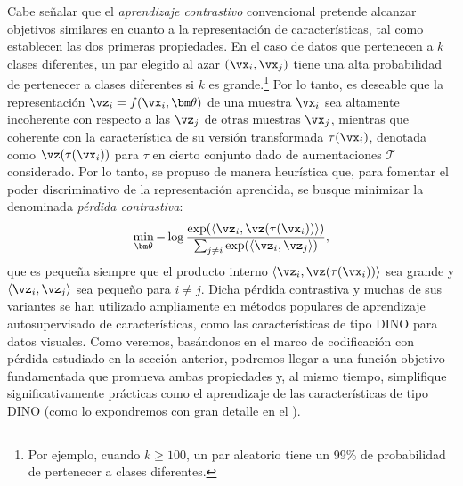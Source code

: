 \documentclass[../../book-main.tex]{subfiles}
\begin{document}
\begin{remark}
    Cabe señalar que el {\em aprendizaje contrastivo} convencional
    \citep{hadsell2006dimensionality,Van_den_Oord2018-qf,he2019momentum}
    pretende alcanzar objetivos similares en cuanto a la representación de características, tal como establecen las dos primeras
    propiedades. En el caso de datos que pertenecen a $k$ clases diferentes,
    un par elegido al azar $(\vx_i, \vx_j)$ tiene una alta probabilidad
    de pertenecer a clases diferentes si $k$ es grande.\footnote{Por
        ejemplo, cuando $k \ge 100$, un par aleatorio tiene un 99\% de probabilidad
    de pertenecer a clases diferentes.} Por lo tanto, es deseable que la
    representación $\vz_i = f(\vx_i, \bm \theta)$ de una muestra $\vx_i$ sea
    altamente incoherente con respecto a las $\vz_j$ de otras muestras $\vx_j$, mientras que
    coherente con la característica de su versión transformada $\tau(\vx_i)$, denotada
    como $\vz(\tau(\vx_i))$ para $\tau$ en cierto conjunto dado de aumentaciones $\mathcal
    T$ considerado. Por lo tanto, se propuso de manera heurística que, para
    fomentar el poder discriminativo de la representación aprendida, se busque
    minimizar la denominada {\em pérdida contrastiva}:
    \begin{equation}
        \min_{\bm \theta} - \log \frac{\exp(\langle \vz_i,
        \vz(\tau(\vx_i))\rangle)}{\sum_{j\not= i} \exp(\langle \vz_i,
        \vz_j\rangle)},
        \label{eqn:contrastive-loss}
    \end{equation}
    que es pequeña siempre que el producto interno $\langle \vz_i,
    \vz(\tau(\vx_i))\rangle$ sea grande y $\langle \vz_i, \vz_j\rangle$ sea
    pequeño para $i \neq j$. Dicha pérdida contrastiva y muchas de sus
    variantes se han utilizado ampliamente en métodos populares de aprendizaje autosupervisado de características, 
    como las características de tipo DINO
    \cite{caron2021unsupervisedlearningvisualfeatures,DINOv2} para datos visuales.
    Como veremos, basándonos en el marco de codificación con pérdida estudiado en
    la sección anterior, podremos llegar a una función objetivo fundamentada
    que promueva ambas propiedades y, al mismo
    tiempo, simplifique significativamente prácticas como el aprendizaje de
    las características de tipo DINO (como lo expondremos con gran detalle en el
    ).
\end{remark}
\end{document}

